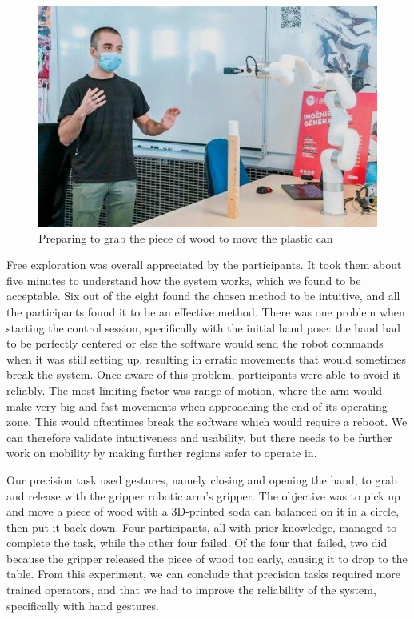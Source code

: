 \begin{figure}[h]
    \centering
    \includegraphics{images/hand_control_grasping.jpg}
    \caption{Preparing to grab the piece of wood to move the plastic can}
    \label{fig:hand_control_task}
\end{figure}

Free exploration was overall appreciated by the participants. It took them about five minutes to understand how the system works, which we found to be acceptable. Six out of the eight found the chosen method to be intuitive, and all the participants found it to be an effective method. There was one problem when starting the control session, specifically with the initial hand pose: the hand had to be perfectly centered or else the software would send the robot commands when it was still setting up, resulting in erratic movements that would sometimes break the system. Once aware of this problem, participants were able to avoid it reliably. The most limiting factor was range of motion, where the arm would make very big and fast movements when approaching the end of its operating zone. This would oftentimes break the software which would require a reboot. We can therefore validate intuitiveness and usability, but there needs to be further work on mobility by making further regions safer to operate in.

Our precision task used gestures, namely closing and opening the hand, to grab and release with the gripper robotic arm's gripper. The objective was to pick up and move a piece of wood with a 3D-printed soda can balanced on it in a circle, then put it back down. Four participants, all with prior knowledge, managed to complete the task, while the other four failed. Of the four that failed, two did because the gripper released the piece of wood too early, causing it to drop to the table. From this experiment, we can conclude that precision tasks required more trained operators, and that we had to improve the reliability of the system, specifically with hand gestures.



